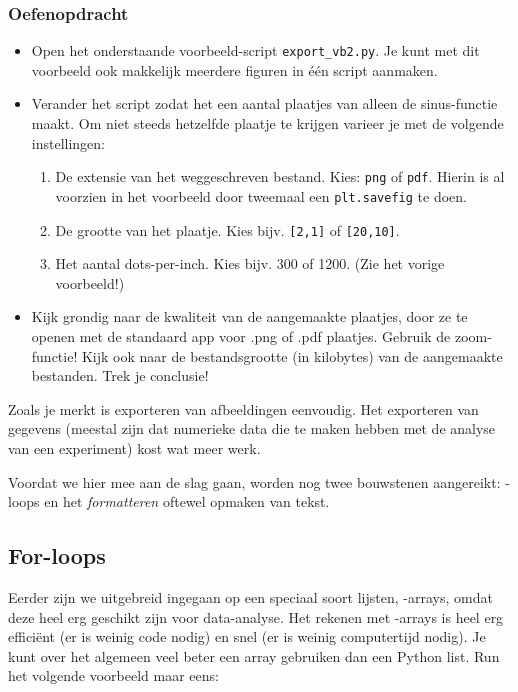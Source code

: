 \documentclass[a4paper,11pt, fleqn]{article}
\begin{document}
\subsubsection*{Oefenopdracht} 
\begin{itemize}
\item Open het onderstaande voorbeeld-script \verb,export_vb2.py,. Je kunt met dit voorbeeld ook makkelijk meerdere figuren in \'e\'en script aanmaken.
\item Verander het script zodat het een aantal plaatjes van alleen de sinus-functie maakt. 
Om niet steeds hetzelfde plaatje te krijgen varieer je met de volgende instellingen:
\begin{enumerate}
\item De extensie van het weggeschreven bestand. Kies: \verb,png, of \verb,pdf,. Hierin is al voorzien in het voorbeeld door tweemaal een \verb,plt.savefig, te doen.
\item De grootte van het plaatje. Kies bijv. \verb=[2,1]= of \verb=[20,10]=.
\item Het aantal dots-per-inch. Kies bijv. 300 of 1200. (Zie het vorige voorbeeld!)
\end{enumerate}

\item Kijk grondig naar de kwaliteit van de aangemaakte plaatjes, door ze te openen met de standaard app voor .png of .pdf plaatjes. Gebruik de zoom-functie!
Kijk ook naar de bestandsgrootte (in kilobytes) van de aangemaakte bestanden. Trek je conclusie!


\end{itemize}

Zoals je merkt is exporteren van afbeeldingen eenvoudig. Het exporteren van gegevens (meestal zijn dat numerieke data die te maken hebben met de analyse van een experiment) kost wat meer werk. 

Voordat we hier mee aan de slag gaan, worden nog twee bouwstenen aangereikt: -loops en het \textit{formatteren} oftewel opmaken van tekst.

\subsection{For-loops}
\label{Ch_forloop}

Eerder zijn we uitgebreid ingegaan op een speciaal soort lijsten, -arrays, omdat deze heel erg geschikt zijn voor data-analyse. 
Het rekenen met -arrays is heel erg efficiënt (er is weinig code nodig) en snel (er is weinig computertijd nodig). Je kunt over het algemeen veel beter een array gebruiken dan een Python list. Run het volgende voorbeeld maar eens:  
\end{document}
